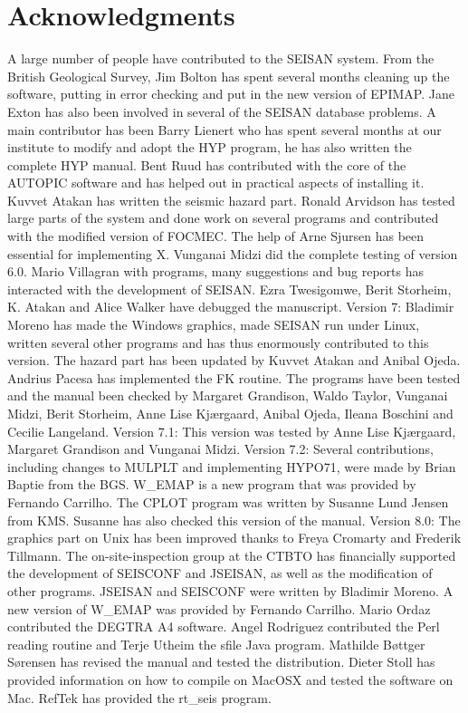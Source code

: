 \chapter{Acknowledgments}

A large number of people have contributed to the SEISAN system. From the British Geological Survey, Jim Bolton has spent several months cleaning up the software, putting in error checking and put in the new version of EPIMAP. Jane Exton has also been involved in several of the SEISAN database problems. A main contributor has been Barry Lienert who has spent several months at our institute to modify and adopt the HYP program, he has also written the complete HYP manual. Bent Ruud has contributed with the core of the AUTOPIC software and has helped out in practical aspects of installing it. Kuvvet Atakan has written the seismic hazard part. Ronald Arvidson has tested large parts of the system and done work on several programs and contributed with the modified version of FOCMEC. The help of Arne Sjursen has been essential for implementing X. Vunganai Midzi did the complete testing of version 6.0. Mario Villagran with programs, many suggestions and bug reports has interacted with the development of SEISAN. Ezra Twesigomwe, Berit Storheim, K. Atakan and Alice Walker have debugged the manuscript. 
Version 7: Bladimir Moreno has made the Windows graphics, made SEISAN run under Linux, written several other programs and has thus enormously contributed to this version. The hazard part has been updated by Kuvvet Atakan and Anibal Ojeda. Andrius Pacesa has implemented the FK routine. The programs have been tested and the manual been checked by Margaret Grandison, Waldo Taylor, Vunganai Midzi, Berit Storheim, Anne Lise Kj\ae rgaard, Anibal Ojeda, Ileana Boschini and Cecilie Langeland. 
Version 7.1: This version was tested by Anne Lise Kj\ae rgaard, Margaret Grandison and Vunganai Midzi. 
Version 7.2: Several contributions, including changes to MULPLT and implementing HYPO71, were made by Brian Baptie from the BGS. W\_EMAP is a new program that was provided by Fernando Carrilho. The CPLOT program was written by Susanne Lund Jensen from KMS. Susanne has also checked this version of the manual. 
Version 8.0: The graphics part on Unix has been improved thanks to Freya Cromarty and Frederik Tillmann. The on-site-inspection group at the CTBTO has financially supported the development of SEISCONF and JSEISAN, as well as the modification of other programs. JSEISAN and SEISCONF were written by Bladimir Moreno. A new version of W\_EMAP was provided by Fernando Carrilho. Mario Ordaz contributed the DEGTRA A4 software. Angel Rodriguez contributed the Perl reading routine and Terje Utheim the sfile Java program. Mathilde B\o ttger S\o rensen has revised the manual and tested the distribution. Dieter Stoll has provided information on how to compile on MacOSX and tested the software on Mac. RefTek has provided the rt\_seis program. 
